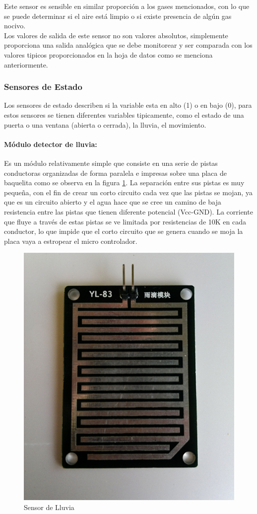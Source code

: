 Este sensor es sensible en similar proporción a los gases mencionados, con lo que se puede determinar si el aire está limpio o si existe presencia de algún gas nocivo.\\

Los valores de salida de este sensor no son valores absolutos, simplemente proporciona una salida analógica que se debe monitorear y ser comparada con los valores tipicos proporcionados en la hoja de datos como se menciona anteriormente.\cite{MQ2}

\subsubsection{Sensores de Estado}

Los sensores de estado describen si la variable esta en alto (1) o en bajo (0), para estos sensores se tienen diferentes variables tipicamente, como el estado de una puerta o una ventana (abierta o cerrada), la lluvia, el movimiento.

\paragraph{Módulo detector de lluvia: }

Es un módulo relativamente simple que consiste en una serie de pistas conductoras organizadas de forma paralela e impresas sobre una placa de baquelita como se observa en la figura \ref{fig:yl-83}. La separación entre sus pistas 
es muy pequeña, con el fin de crear un corto circuito cada vez que las pistas se mojan, ya que es un circuito abierto y el agua hace que se cree un camino de baja resistencia entre las pistas que tienen diferente potencial (Vcc-GND). La corriente que fluye a través de estas pistas se ve limitada por resistencias de 10K en cada conductor, lo que impide que el corto circuito que se genera cuando se moja la placa vaya a estropear el micro controlador.\cite{LLU}

\begin{figure}[H]
	\centering
	\caption{Sensor de Lluvia \cite{LLU}}
	\label{fig:yl-83}
	\includegraphics[width=0.35\linewidth]{Imagenes/YL-83}
\end{figure}

